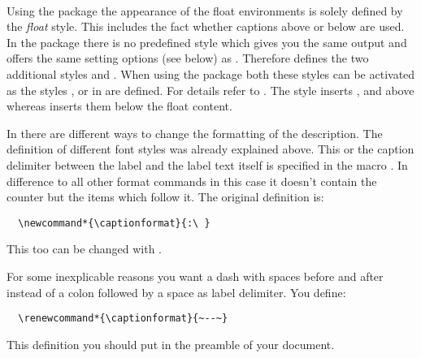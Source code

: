 \begin{Explain}
\begin{Declaration}
  \\
\end{Declaration}%
%
%
Using the  package
the appearance of the float environments is solely defined by the \emph{float}
style. This includes the fact whether captions above or below are used. In the
 package there is no predefined style which gives you the same
output and offers the same setting options (see below) as \KOMAScript{}.
Therefore \KOMAScript{} defines the two additional styles 
and .  When using the  package both these
styles can be activated as the styles ,
 or 
in  are defined.  For details refer to \cite{package:float}.
The style  inserts ,  and
 above whereas  inserts them below the
float content.
%
%
%
\end{Explain}


\begin{Declaration}
\end{Declaration}%
%
In {\KOMAScript} there are different ways to change the formatting of
the description. The definition of different font styles was already
explained above. This or the caption delimiter between the label and
the label text itself is specified in the macro .
In difference to all other \Macro{\dots}format commands in this case
it doesn't contain the counter but the items which follow it. The
original definition is:
\begin{lstlisting}
  \newcommand*{\captionformat}{:\ }
\end{lstlisting}
This too can be changed with .
\begin{Example}
  For some inexplicable reasons you want a dash with spaces before and
  after instead of a colon followed by a space as label delimiter. You
  define:
\begin{lstlisting}
  \renewcommand*{\captionformat}{~--~}
\end{lstlisting}
  This definition you should put in the preamble of your document.
\end{Example}
%
%


